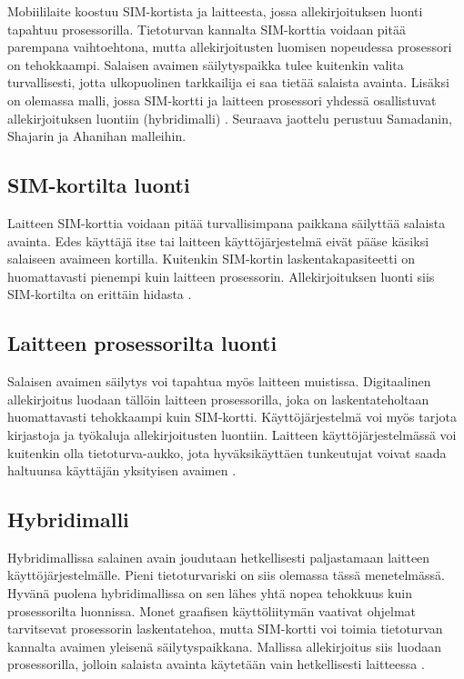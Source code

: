 \documentclass[finnish]{tktltiki2}
\theoremstyle{definition}
\theoremstyle{remark}
\begin{document}
Mobiililaite koostuu SIM-kortista ja laitteesta, jossa allekirjoituksen luonti tapahtuu prosessorilla. Tietoturvan kannalta SIM-korttia voidaan pitää parempana vaihtoehtona, mutta allekirjoitusten luomisen nopeudessa prosessori on tehokkaampi. Salaisen avaimen säilytyspaikka tulee kuitenkin valita turvallisesti, jotta ulkopuolinen tarkkailija ei saa tietää salaista avainta. Lisäksi on olemassa malli, jossa SIM-kortti ja laitteen prosessori yhdessä osallistuvat allekirjoituksen luontiin (hybridimalli) \cite{proxy}. Seuraava jaottelu perustuu Samadanin, Shajarin ja Ahanihan malleihin. 
 
\subsection{SIM-kortilta luonti}

Laitteen SIM-korttia voidaan pitää turvallisimpana paikkana säilyttää salaista avainta. Edes käyttäjä itse tai laitteen käyttöjärjestelmä eivät pääse käsiksi salaiseen avaimeen kortilla. Kuitenkin SIM-kortin laskentakapasiteetti on huomattavasti pienempi kuin laitteen prosessorin. Allekirjoituksen luonti siis SIM-kortilta on erittäin hidasta \cite{proxy}.  

\subsection{Laitteen prosessorilta luonti}

Salaisen avaimen säilytys voi tapahtua myös laitteen muistissa. Digitaalinen allekirjoitus luodaan tällöin laitteen prosessorilla, joka on laskentateholtaan huomattavasti tehokkaampi kuin SIM-kortti. Käyttöjärjestelmä voi myös tarjota kirjastoja ja työkaluja allekirjoitusten luontiin. Laitteen käyttöjärjestelmässä voi kuitenkin olla tietoturva-aukko, jota hyväksikäyttäen tunkeutujat voivat saada haltuunsa käyttäjän yksityisen avaimen \cite{proxy}.

\subsection{Hybridimalli}

Hybridimallissa salainen avain joudutaan hetkellisesti paljastamaan laitteen käyttöjärjestelmälle. Pieni tietoturvariski on siis olemassa tässä menetelmässä. Hyvänä puolena hybridimallissa on sen lähes yhtä nopea tehokkuus kuin prosessorilta luonnissa. Monet graafisen käyttöliitymän vaativat ohjelmat tarvitsevat prosessorin laskentatehoa, mutta SIM-kortti voi toimia tietoturvan kannalta avaimen yleisenä säilytyspaikkana. Mallissa allekirjoitus siis luodaan prosessorilla, jolloin salaista avainta käytetään vain hetkellisesti laitteessa \cite{proxy}.
\end{document}
